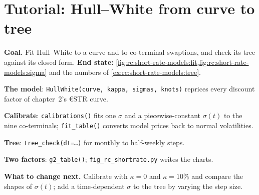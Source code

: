 \begin{omfigure}

\label{fig:rc:short-rate-models:g2}
\end{omfigure}

\section{Tutorial: Hull--White from curve to tree}\label{tut:rc:short-rate-models:tutorial}

\begin{tutorial}
\textbf{Goal.} Fit Hull--White to a curve and to co-terminal swaptions, and check
its tree against its closed form. \textbf{End state:}
\cref{fig:rc:short-rate-models:fit,fig:rc:short-rate-models:sigma} and the numbers of
\cref{ex:rc:short-rate-models:tree}.
\begin{tutsteps}
\item \textbf{The model}: \texttt{HullWhite(curve, kappa, sigmas, knots)} reprices
every discount factor of chapter~2's €STR curve.
\item \textbf{Calibrate}: \texttt{calibrations()} fits one $\sigma$ and a
piecewise-constant $\sigma(t)$ to the nine co-terminals;
\texttt{fit\_table()} converts model prices back to normal volatilities.
\item \textbf{Tree}: \texttt{tree\_check(dt=\ldots)} for monthly to half-weekly steps.
\item \textbf{Two factors}: \texttt{g2\_table()}; \texttt{fig\_rc\_shortrate.py}
writes the charts.
\end{tutsteps}
\textbf{What to change next.} Calibrate with $\kappa=0$ and $\kappa=10\%$ and compare
the shapes of $\sigma(t)$; add a time-dependent $\sigma$ to the tree by varying the
step size.
\end{tutorial}

